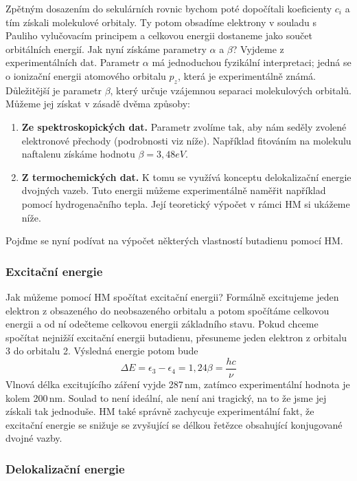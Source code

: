 Zpětným dosazením do sekulárních rovnic bychom poté dopočítali koeficienty $c_i$ a tím získali molekulové orbitaly. Ty potom obsadíme elektrony v souladu s Pauliho vylučovacím principem a celkovou energii dostaneme jako součet orbitálních energií. 
Jak nyní získáme parametry $\alpha$ a $\beta$? Vyjdeme z experimentálních dat. Parametr $\alpha$ má jednoduchou fyzikální interpretaci; jedná se o ionizační energii atomového orbitalu $p_z$, která je experimentálně známá. Důležitější je parametr $\beta$, který určuje vzájemnou separaci molekulových orbitalů. Můžeme jej získat v zásadě dvěma způsoby:
\begin{enumerate}
\item \textbf{Ze spektroskopických dat.} Parametr zvolíme tak, aby nám seděly zvolené elektronové přechody (podrobnosti viz níže). Například fitováním na molekulu naftalenu získáme hodnotu $\beta=3,48 eV$.
\item \textbf{Z termochemických dat.} K tomu se využívá konceptu delokalizační energie dvojných vazeb. Tuto energii můžeme experimentálně naměřit například pomocí hydrogenačního tepla. Její teoretický výpočet v rámci HM si ukážeme níže. 
\end{enumerate}

Pojďme se nyní podívat na výpočet některých vlastností butadienu pomocí HM. 

\subsubsection{Excitační energie}

Jak můžeme pomocí HM spočítat excitační energii? Formálně excitujeme jeden elektron z obsazeného do neobsazeného orbitalu a potom spočítáme celkovou energii a od ní odečteme celkovou energii základního stavu. Pokud chceme spočítat nejnižší excitační energii butadienu, přesuneme jeden elektron z orbitalu 3 do orbitalu 2. Výsledná energie potom bude
$$
\Delta E = \epsilon_3-\epsilon_4 = 1,24 \beta = \frac{hc}{\nu} 
$$
Vlnová délka excitujícího záření vyjde 287\,nm, zatímco experimentální hodnota je kolem 200\,nm.
Soulad to není ideální, ale není ani tragický, na to že jsme jej získali tak jednoduše. HM také správně zachycuje experimentální fakt, že excitační energie se snižuje se zvyšující se délkou řetězce obsahující konjugované dvojné vazby.

\subsubsection{Delokalizační energie}

